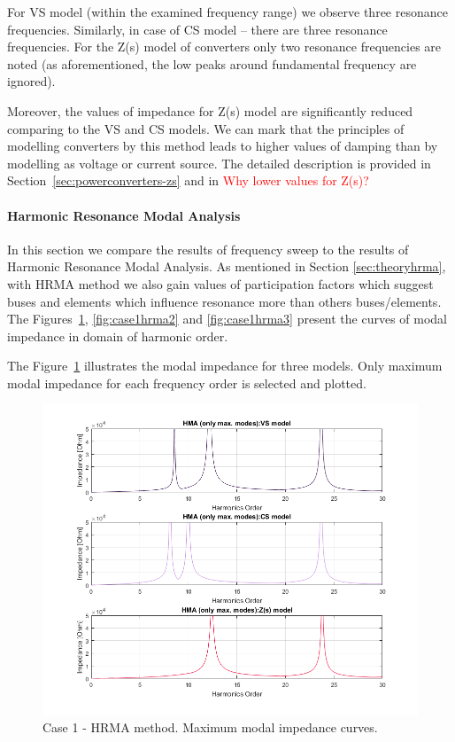 \documentclass[12pt]{report} %
\begin{document}
For VS model (within the examined frequency range) we observe three resonance frequencies. Similarly, in case of CS model – there are three resonance frequencies. For the Z(s) model of converters only two resonance frequencies are noted (as aforementioned, the low peaks around fundamental frequency are ignored).

Moreover, the values of impedance for Z(s) model are significantly reduced comparing to the VS and CS models. We can mark that the principles of modelling converters by this method leads to higher values of damping than by modelling as voltage or current source. The detailed description is provided in Section~\ref{sec:powerconverters-zs} and in \cite{liusun2013, liusun2014} \textcolor{red} {Why lower values for Z(s)?}

\paragraph{Harmonic Resonance Modal Analysis}
In this section we compare the results of frequency sweep to the results of Harmonic Resonance Modal Analysis. As mentioned in Section \ref{sec:theoryhrma}, with HRMA method we also gain values of participation factors which suggest buses and elements which influence resonance more than others buses/elements. The Figures~\ref{fig:case1hrma1}, \ref{fig:case1hrma2} and \ref{fig:case1hrma3} present the curves of modal impedance in domain of harmonic order.

The Figure~\ref{fig:case1hrma1} illustrates the modal impedance for three models. Only maximum modal impedance for each frequency order is selected and plotted.

\begin{figure}[htb]
	\centering
	\includegraphics[width=1\textwidth]{img/Case1/Case1_HMA_max.png}
  	\caption{Case 1 - HRMA method. Maximum modal impedance curves.}
  	\label{fig:case1hrma1}
\end{figure}
\FloatBarrier
\end{document}

